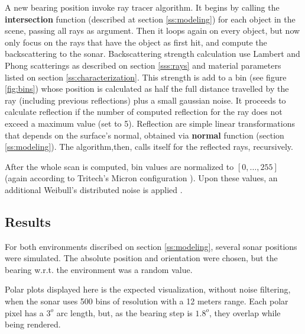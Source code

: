 A new bearing position invoke ray tracer algorithm. It begins by calling
the \textbf{intersection} function (described at section \ref{ss:modeling}) for each
object in the scene, passing all rays as argument. Then it loops again on every
object, but now only focus on the rays that have the object as first hit, and
compute the backscattering to the sonar. Backscattering strength calculation use
Lambert and Phong scatterings as described on section \ref{sss:rays} and material
parameters listed on section \ref{ss:characterization}. This strength is add to
a bin (see figure \ref{fig:bins}) whose position is calculated as half the full
distance travelled by the ray (including previous reflections) plus a small
gaussian noise. It proceeds to calculate reflection if the number of computed
reflection for the ray does not exceed a maximum value (set to 5). Reflection
are simple linear transformations that depends on the surface's normal, obtained
via \textbf{normal} function (section \ref{ss:modeling}). The algorithm,then,
calls itself for the reflected rays, recursively.

After the whole scan is computed, bin values are normalized to $[0,\ldots,255]$
(again according to Tritech's Micron configuration ). Upon these values, an
additional Weibull's distributed noise is applied \cite{maussang2007mean}.

\subsection{Results}
\label{ss:results}

For both environments discribed on section \ref{ss:modeling}, several sonar
positions were simulated. The absolute position and orientation were chosen, but
the bearing w.r.t. the environment was a random value.

Polar plots displayed here is the expected visualization, without noise
filtering, when the sonar uses 500 bins of resolution with a 12 meters range.
Each polar pixel has a $3^o$ arc length, but, as the bearing step is $1.8^o$,
they overlap while being rendered.

